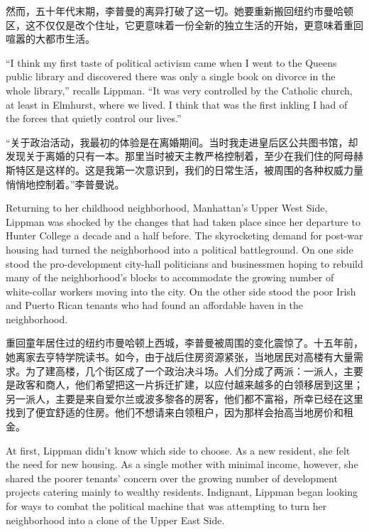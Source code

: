 \ifdefined\chs
然而，五十年代末期，李普曼的离异打破了这一切。她要重新搬回纽约市曼哈顿区，这不仅仅是改个住址，它更意味着一份全新的独立生活的开始，更意味着重回喧嚣的大都市生活。
\fi

\ifdefined\eng
``I think my first taste of political activism came when I went to the Queens public library and discovered there was only a single book on divorce in the whole library,'' recalls Lippman. ``It was very controlled by the Catholic church, at least in Elmhurst, where we lived. I think that was the first inkling I had of the forces that quietly control our lives.''
\fi

\ifdefined\chs
``关于政治活动，我最初的体验是在离婚期间。当时我走进皇后区公共图书馆，却发现关于离婚的只有一本。那里当时被天主教严格控制着，至少在我们住的阿母赫斯特区是这样的。这是我第一次意识到，我们的日常生活，被周围的各种权威力量悄悄地控制着。''李普曼说。
\fi

\ifdefined\eng
Returning to her childhood neighborhood, Manhattan's Upper West Side, Lippman was shocked by the changes that had taken place since her departure to Hunter College a decade and a half before. The skyrocketing demand for post-war housing had turned the neighborhood into a political battleground. On one side stood the pro-development city-hall politicians and businessmen hoping to rebuild many of the neighborhood's blocks to accommodate the growing number of white-collar workers moving into the city. On the other side stood the poor Irish and Puerto Rican tenants who had found an affordable haven in the neighborhood.
\fi

\ifdefined\chs
重回童年居住过的纽约市曼哈顿上西城，李普曼被周围的变化震惊了。十五年前，她离家去亨特学院读书。如今，由于战后住房资源紧张，当地居民对高楼有大量需求。为了建高楼，几个街区成了一个政治决斗场。人们分成了两派：一派人，主要是政客和商人，他们希望把这一片拆迁扩建，以应付越来越多的白领移居到这里；另一派人，主要是来自爱尔兰或波多黎各的房客，他们都不富裕，所幸已经在这里找到了便宜舒适的住房。他们不想请来白领租户，因为那样会抬高当地房价和租金。
\fi

\ifdefined\eng
At first, Lippman didn't know which side to choose. As a new resident, she felt the need for new housing. As a single mother with minimal income, however, she shared the poorer tenants' concern over the growing number of development projects catering mainly to wealthy residents. Indignant, Lippman began looking for ways to combat the political machine that was attempting to turn her neighborhood into a clone of the Upper East Side.
\fi

